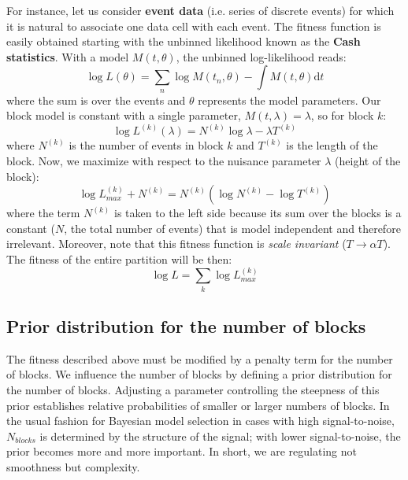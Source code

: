\documentclass[prb,twocolumn]{revtex4-1}
\begin{document}
For instance, let us consider \textbf{event data} (i.e. series of discrete events) for which it is natural to associate one data cell with each event. 
The fitness function is easily obtained starting with the unbinned likelihood known as the \textbf{Cash statistics}. 
With a model $M(t,\theta)$, the unbinned log-likelihood reads:
\begin{equation}
    \log L(\theta) = \sum_n \log M(t_n,\theta) - \int M(t,\theta) \text{d} t
\end{equation}
where the sum is over the events and $\theta$ represents the model parameters.
Our block model is constant with a single parameter, $M(t,\lambda) = \lambda$, so for block $k$: 
\begin{equation}
\log L^{(k)} (\lambda) = N^{(k)} \log \lambda - \lambda T^{(k)}
\end{equation}
where $N^{(k)}$ is the number of events in block $k$ and $T^{(k)}$ is the length of the block. 
Now, we maximize with respect to the nuisance parameter $\lambda$ (height of the block):
\begin{equation}
\log L_{max} ^{(k)} + N^{(k)} = N^{(k)} ( \log N^{(k)} - \log T^{(k)} )
\end{equation}
where the term $N^{(k)}$ is taken to the left side because its sum over the blocks is a constant ($N$, the total number of events) that is model independent and therefore irrelevant.
Moreover, note that this fitness function is \textit{scale invariant} ($T \rightarrow \alpha T$). 
The fitness of the entire partition will be then:
\begin{equation}
    \log L = \sum_k \log L_{max}^{(k)}
\end{equation}

\subsection{Prior distribution for the number of blocks}

The fitness described above must be modified by a penalty term for the number of blocks. 
We influence the number of blocks by defining a prior distribution for the number of blocks. Adjusting a parameter controlling the steepness of this prior establishes relative probabilities of smaller or larger numbers of blocks.
In the usual fashion for Bayesian model selection in cases with high signal-to-noise, $N_{blocks}$ is determined by the structure of the signal; with lower signal-to-noise, the prior becomes more and more important. In short, we are regulating not smoothness but complexity.
\end{document}
